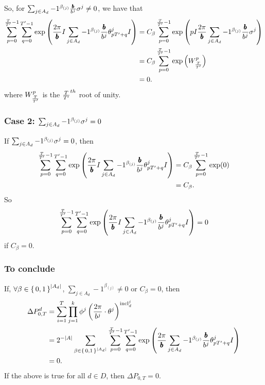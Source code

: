 So, for $\sum_{j \in A_d} -1 ^ {\beta_{(j)}}\frac{{\pmb{b}}}{b^j} \sigma^j \neq 0$, we have that
\begin{align*}
  \sum_{p= 0}^{\frac{T}{{T}'} - 1} \sum_{q = 0}^{{T}' - 1} \exp\left( \frac{2\pi}{{\pmb{b}}} I \sum_{j \in A_d} -1 ^ {\beta_{(j)}} \frac{{\pmb{b}}}{b^j} {\theta^j_{p {T}' + q}}I \right) &= C_\beta \sum_{p= 0}^{\frac{T}{{T}'} - 1}
    \exp\left(
      pI \frac{2\pi}{{\pmb{b}}} \sum_{j \in A_d} -1 ^ {\beta_{(j)}}
      \frac{{\pmb{b}}}{b^j}
      \sigma^j
    \right) \\
    &= C_\beta \sum_{p = 0}^{\frac{T}{{T}'} - 1}\exp\left(W_{\frac{T}{{T}'}}^p\right) \\
    &= 0.
\end{align*}
where $W_{\frac{T}{{T}'}}^p$ is the $\frac{T}{{T}'}^{th}$ root of unity.

\subsubsection*{Case 2: $\sum_{j \in A_d} -1 ^ {\beta_{(j)}} \sigma^j = 0$}
If $\sum_{j \in A_d} -1 ^ {\beta_{(j)}} \sigma^j = 0$, then 
\begin{align*}
  \sum_{p= 0}^{\frac{T}{{T}'} - 1} \sum_{q = 0}^{{T}' - 1} \exp\left( \frac{2\pi}{{\pmb{b}}} I \sum_{j \in A_d} -1 ^ {\beta_{(j)}} \frac{{\pmb{b}}}{b^j} {\theta^j_{p {T}' + q}}I \right) &= C_\beta \sum_{p= 0}^{\frac{T}{{T}'} - 1} \exp(0) \\
  &= C_\beta.
\end{align*}
So $$\sum_{p= 0}^{\frac{T}{{T}'} - 1} \sum_{q = 0}^{{T}' - 1} \exp\left( \frac{2\pi}{{\pmb{b}}} I \sum_{j \in A_d} -1 ^ {\beta_{(j)}} \frac{{\pmb{b}}}{b^j} {\theta^j_{p {T}' + q}}I \right) = 0$$ if $C_\beta = 0$.

\subsubsection*{To conclude}
If, $\forall \beta \in \set{0, 1}^{|A_d|}$, $\sum_{j \in A_d} -1 ^ {\beta_{(j)}} \neq 0$
or $C_\beta = 0$, then
\begin{align*}
  \Delta P_{0, T}^d &= \sum_{i = 1}^T \prod_{j=1}^k \phi^j\left(\frac{2\pi}{b^j} \cdot \theta^j\right) ^ {{\mathrm{incl}_{d}^{j}}} \\&=  2^{-|A|}
  \sum_{\beta \in \set{0,1}^{|A_d|}} 
      \sum_{p= 0}^{\frac{T}{{T}'} - 1} \sum_{q = 0}^{{T}' - 1}
     \exp\left(
       \frac{2\pi}{{\pmb{b}}}
         \sum_{j \in A_d} -1 ^ {\beta_{(j)}}
         \frac{{\pmb{b}}}{b^j}
         {\theta^j_{p {T}' + q}}I
       \right) \\
        &= 0.
\end{align*}
If the above is true for all $d \in D$, then 
$\Delta P_{0, T} = 0$.
